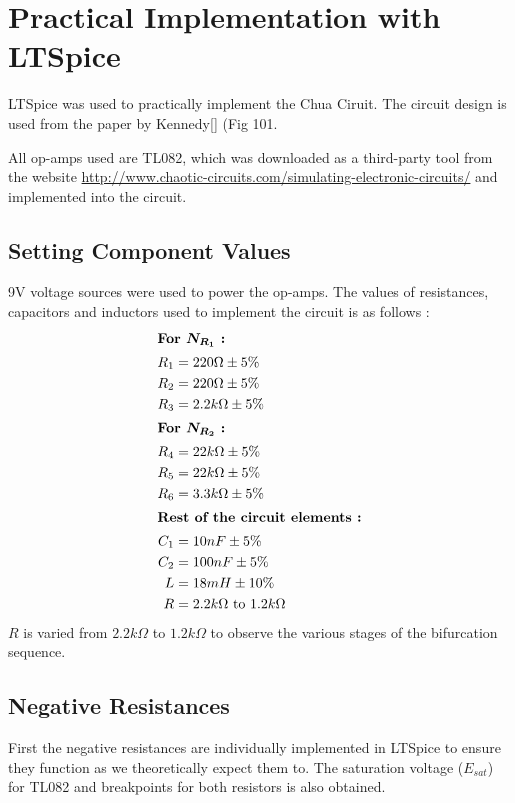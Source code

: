 \documentclass[12pt]{article}
\begin{document}
\section{Practical Implementation with LTSpice}
LTSpice was used to practically implement the Chua Ciruit. The circuit design is used from the paper by Kennedy[{\color{red}{put ref}}] (Fig 101. \linebreak

All op-amps used are TL082, which was downloaded as a third-party tool from the website \url{http://www.chaotic-circuits.com/simulating-electronic-circuits/} and implemented into the circuit.\linebreak
\subsection{Setting Component Values}
9V voltage sources were used to power the op-amps. The values of resistances, capacitors and inductors used to implement the circuit is as follows :
\begin{align*}
	\intertext{\textbf{For $\bm{N_{R_1}}$ :}}
	R_1 &= 220\Omega \pm 5\% \\
	R_2 &= 220\Omega \pm 5\% \\
	R_3 &= 2.2k\Omega \pm 5\% \\
	\intertext{\textbf{For $\bm{N_{R_2}}$ :}}
	R_4 &= 22k\Omega \pm 5\% \\
	R_5 &= 22k\Omega \pm 5\% \\
	R_6 &= 3.3k\Omega \pm 5\% \\ 
	\intertext{\textbf{Rest of the circuit elements :}}
	C_1 &= 10nF \pm 5\% \\
	C_2 &= 100nF \pm 5\% \\
	L &= 18mH \pm 10\% \\
	R &= 2.2k\Omega \text{ to } 1.2k\Omega 
\end{align*}
$R$ is varied from $2.2k\Omega$ to $1.2k\Omega$ to observe the various stages of the bifurcation sequence. 
\subsection{Negative Resistances}
First the negative resistances are individually implemented in LTSpice to ensure they function as we theoretically expect them to. The saturation voltage ($E_{sat}$) for TL082 and breakpoints for both resistors is also obtained. \linebreak
\end{document}
